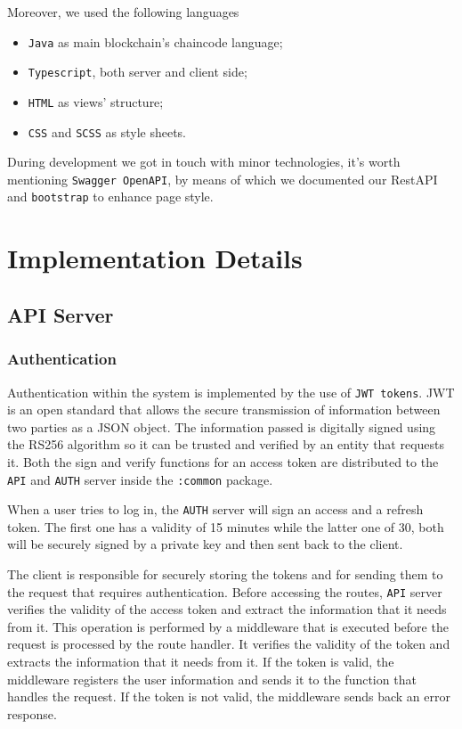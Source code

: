 \documentclass{scrartcl}
\begin{document}
Moreover, we used the following languages
\begin{itemize}
    \item \texttt{Java} as main blockchain's chaincode language;
    \item \texttt{Typescript}, both server and client side;
    \item \texttt{HTML} as views' structure;
    \item \texttt{CSS} and \texttt{SCSS} as style sheets.
\end{itemize}

During development we got in touch with minor technologies, it's worth mentioning \texttt{Swagger OpenAPI}, by means of which we documented our RestAPI and \texttt{bootstrap} to enhance page style.

\section{Implementation Details}

\subsection{API Server}

\subsubsection{Authentication}
Authentication within the system is implemented by the use of \texttt{JWT tokens}. JWT \cite{jwt} is an open standard that allows the secure transmission of information between two parties as a JSON object. The information passed is digitally signed using the RS256 algorithm so it can be trusted and verified by an entity that requests it. Both the sign and verify functions for an access token are distributed to the \texttt{API} and \texttt{AUTH} server inside the \texttt{:common} package.

When a user tries to log in, the \texttt{AUTH} server will sign an access and a refresh token. The first one has a validity of 15 minutes while the latter one of 30, both will be securely signed by a private key and then sent back to the client. 


The client is responsible for securely storing the tokens and for sending them to the request that requires authentication. Before accessing the routes, \texttt{API} server verifies the validity of the access token and extract 
the information that it needs from it.
This operation is performed by a middleware that is executed before the request is processed by the route handler. It verifies the validity of the token and extracts the information that it needs from it. If the token is valid, the middleware registers the user information and sends it to the function that handles the request. If the token is not valid, the middleware sends back an error response.
\end{document}

